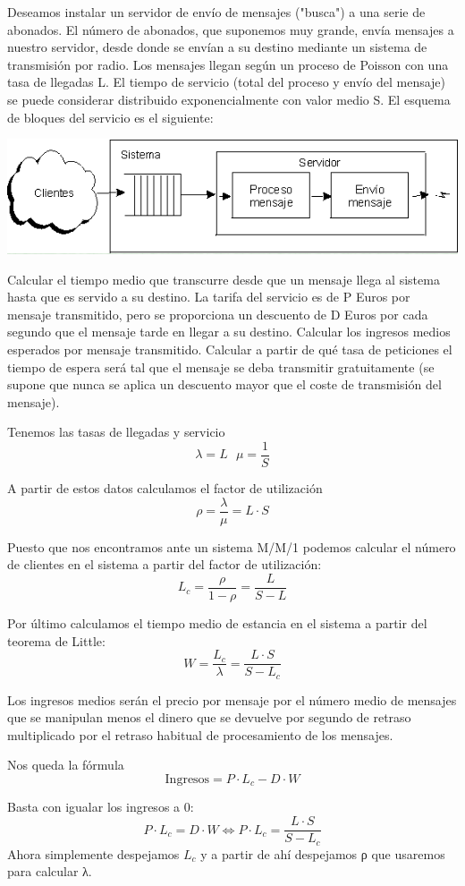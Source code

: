 \begin{problem}[7]\label{tema2:prob7}
Deseamos instalar un servidor de envío de mensajes ("busca") a una serie de abonados. El número de abonados, que suponemos muy grande, envía mensajes a nuestro servidor, desde donde se envían a su destino mediante un sistema de transmisión por radio. Los mensajes llegan según un proceso de Poisson con una tasa de llegadas L. El tiempo de servicio (total del proceso y envío del mensaje) se puede considerar distribuido exponencialmente con valor medio S. El esquema de bloques del servicio es el siguiente:

\begin{center}
  \includegraphics[keepaspectratio=true,width=\linewidth]{img/ej7.png}
\end{center}


\ppart Calcular el tiempo medio que transcurre desde que un mensaje llega al sistema hasta que es servido a su destino.
\ppart La tarifa del servicio es de P Euros por mensaje transmitido, pero se proporciona un descuento de D Euros por cada segundo que el mensaje tarde en llegar a su destino. Calcular los ingresos medios esperados por mensaje transmitido.
\ppart Calcular a partir de qué tasa de peticiones el tiempo de espera será tal que el mensaje se deba transmitir gratuitamente (se supone que nunca se aplica un descuento mayor que el coste de transmisión del mensaje).


\newpage
\solution

\yoP


\spart
Tenemos las tasas de llegadas y servicio
\[λ=L \ \ \ μ=\frac{1}{S}\]

A partir de estos datos calculamos el factor de utilización
\[ρ = \frac{λ}{μ}=L\cdot S\]

Puesto que nos encontramos ante un sistema M/M/1 podemos calcular el número de clientes en el sistema a partir del factor de utilización:
\[L_c=\frac{ρ}{1-ρ}=\frac{L}{S-L}\]

Por último calculamos el tiempo medio de estancia en el sistema a partir del teorema de Little:
\[W = \frac{L_c}{λ}=\frac{L\cdot S}{S-L_c}\]

\spart

Los ingresos medios serán el precio por mensaje por el número medio de mensajes que se manipulan menos el dinero que se devuelve por segundo de retraso multiplicado por el retraso habitual de procesamiento de los mensajes.

Nos queda la fórmula
\[\text{Ingresos} = P \cdot L_c - D \cdot W\]

\spart

Basta con igualar los ingresos a 0:
\[P\cdot L_c = D \cdot W \iff P \cdot L_c = \frac{L\cdot S}{S-L_c} \]
Ahora simplemente despejamos $L_c$ y a partir de ahí despejamos ρ que usaremos para calcular λ.


\end{problem}

